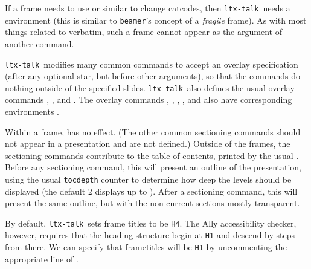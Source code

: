 \documentclass{ltugboat}
\newcommand{\beamer}{\texttt{beamer}}
\newcommand{\ltxtalk}{\texttt{ltx-talk}}
\begin{document}
If a frame needs to use  or similar to change catcodes,
then \ltxtalk\ needs a  environment
(this is similar to \beamer's concept of a \emph{fragile} frame).
As with most things related to verbatim,
such a frame cannot appear as the argument of another command.


\ltxtalk\ modifies many common commands to accept an overlay specification
(after any optional star, but before other arguments),
so that the commands do nothing outside of the specified slides.
\ltxtalk\ also defines the usual overlay commands
, , and .
The overlay commands
, , , , and 
also have corresponding environments .



Within a frame,
has no effect.
(The other common sectioning commands should not appear in a presentation and
are not defined.)
Outside of the frames, the sectioning commands
contribute to the table of contents, printed by the usual .
Before any sectioning command,
this will present an outline of the presentation,
using the usual \texttt{tocdepth} counter to determine
how deep the levels should be displayed
(the default 2 displays up to ).
After a sectioning command, this will present the same outline,
but with the non-current sections mostly transparent.

By default, \ltxtalk\ sets frame titles to be \texttt{H4}.
The Ally accessibility checker, however,
requires that the heading structure begin at \texttt{H1} and
descend by steps from there.
We can specify that frametitles will be \texttt{H1} by uncommenting
the appropriate line of .
\end{document}
